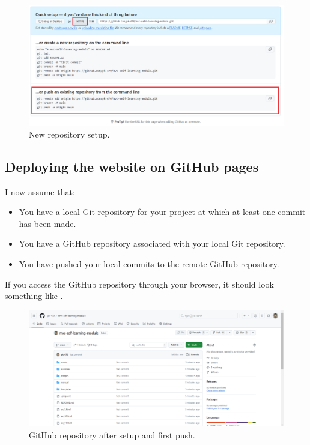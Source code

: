 \documentclass[a4paper,10pt]{article}
\begin{document}
\begin{figure}[htbp]
    \centering
    \includegraphics[width=\textwidth]{new_repository_setup.png}
    \caption{New repository setup.}
    \label{new_repository_setup}   
\end{figure}

\subsection{Deploying the website on GitHub pages}

I now assume that:
\begin{itemize}
    \item You have a local Git repository for your project at which at least one commit has been made.
    \item You have a GitHub repository associated with your local Git repository.
    \item You have pushed your local commits to the remote GitHub repository.
\end{itemize}
If you access the GitHub repository through your browser, it should look something like .

\begin{figure}[htbp]
    \centering
    \includegraphics[width=\textwidth]{mvc_repository.png}
    \caption{GitHub repository after setup and first push.}
    \label{mvc_repository}   
\end{figure}
\end{document}
